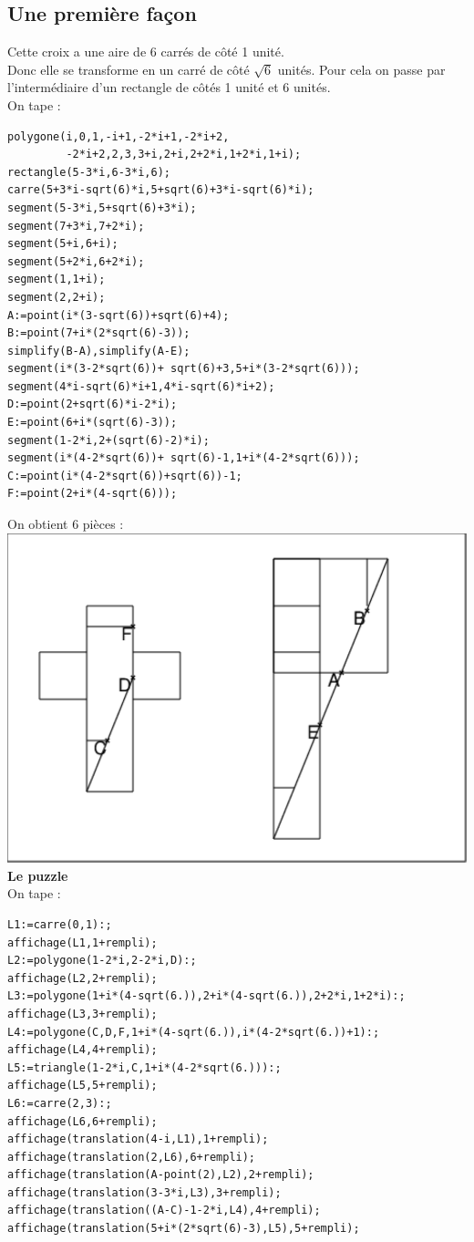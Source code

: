 \documentclass[a4paper,11pt]{book}
\begin{document}
\subsection{Une premi\`ere fa\c{c}on}
Cette croix a une aire de 6 carr\'es de c\^ot\'e 1 unit\'e.\\
Donc elle se transforme en un carr\'e de c\^ot\'e $\sqrt 6$ unit\'es.
Pour cela on passe par l'interm\'ediaire d'un rectangle de c\^ot\'es  1 unit\'e
et 6 unit\'es.\\
On tape :
\begin{verbatim}
polygone(i,0,1,-i+1,-2*i+1,-2*i+2, 
         -2*i+2,2,3,3+i,2+i,2+2*i,1+2*i,1+i);
rectangle(5-3*i,6-3*i,6);
carre(5+3*i-sqrt(6)*i,5+sqrt(6)+3*i-sqrt(6)*i);
segment(5-3*i,5+sqrt(6)+3*i);
segment(7+3*i,7+2*i);
segment(5+i,6+i);
segment(5+2*i,6+2*i);
segment(1,1+i);
segment(2,2+i);
A:=point(i*(3-sqrt(6))+sqrt(6)+4);
B:=point(7+i*(2*sqrt(6)-3));
simplify(B-A),simplify(A-E);
segment(i*(3-2*sqrt(6))+ sqrt(6)+3,5+i*(3-2*sqrt(6)));
segment(4*i-sqrt(6)*i+1,4*i-sqrt(6)*i+2);
D:=point(2+sqrt(6)*i-2*i);
E:=point(6+i*(sqrt(6)-3));
segment(1-2*i,2+(sqrt(6)-2)*i);
segment(i*(4-2*sqrt(6))+ sqrt(6)-1,1+i*(4-2*sqrt(6)));
C:=point(i*(4-2*sqrt(6))+sqrt(6))-1;
F:=point(2+i*(4-sqrt(6)));
\end{verbatim}
On obtient 6 pi\`eces :\\
\includegraphics[width=\textwidth]{puzzlecroix7}\\
{\bf Le puzzle}\\
On tape :
\begin{verbatim}
L1:=carre(0,1):;
affichage(L1,1+rempli);
L2:=polygone(1-2*i,2-2*i,D):;
affichage(L2,2+rempli);
L3:=polygone(1+i*(4-sqrt(6.)),2+i*(4-sqrt(6.)),2+2*i,1+2*i):;
affichage(L3,3+rempli);
L4:=polygone(C,D,F,1+i*(4-sqrt(6.)),i*(4-2*sqrt(6.))+1):;
affichage(L4,4+rempli);
L5:=triangle(1-2*i,C,1+i*(4-2*sqrt(6.))):; 
affichage(L5,5+rempli);
L6:=carre(2,3):;
affichage(L6,6+rempli);
affichage(translation(4-i,L1),1+rempli);
affichage(translation(2,L6),6+rempli);
affichage(translation(A-point(2),L2),2+rempli);
affichage(translation(3-3*i,L3),3+rempli);
affichage(translation((A-C)-1-2*i,L4),4+rempli);
affichage(translation(5+i*(2*sqrt(6)-3),L5),5+rempli);
\end{verbatim}
\end{document}
